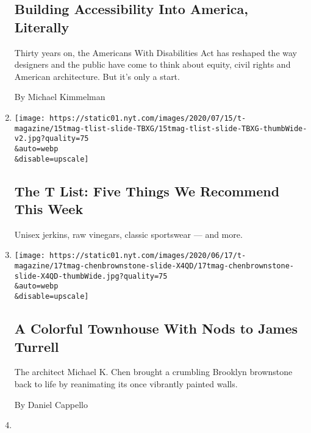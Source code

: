 \begin{enumerate}
  \hypertarget{building-accessibility-into-america-literally}{%
  \subsection{Building Accessibility Into America,
  Literally}\label{building-accessibility-into-america-literally}}

  Thirty years on, the Americans With Disabilities Act has reshaped the
  way designers and the public have come to think about equity, civil
  rights and American architecture. But it's only a start.

  By Michael Kimmelman
\item
  \href{/2020/07/16/t-magazine/margo-price-album-tlist.html}{}

  \texttt{[image: https://static01.nyt.com/images/2020/07/15/t-magazine/15tmag-tlist-slide-TBXG/15tmag-tlist-slide-TBXG-thumbWide-v2.jpg?quality=75\\\&auto=webp\\\&disable=upscale]}

  \hypertarget{the-t-list-five-things-we-recommend-this-week-1}{%
  \subsection{The T List: Five Things We Recommend This
  Week}\label{the-t-list-five-things-we-recommend-this-week-1}}

  Unisex jerkins, raw vinegars, classic sportswear --- and more.
\item
  \href{/2020/07/13/t-magazine/brownstone-brooklyn-design.html}{}

  \texttt{[image: https://static01.nyt.com/images/2020/06/17/t-magazine/17tmag-chenbrownstone-slide-X4QD/17tmag-chenbrownstone-slide-X4QD-thumbWide.jpg?quality=75\\\&auto=webp\\\&disable=upscale]}

  \hypertarget{a-colorful-townhouse-with-nods-to-james-turrell}{%
  \subsection{A Colorful Townhouse With Nods to James
  Turrell}\label{a-colorful-townhouse-with-nods-to-james-turrell}}

  The architect Michael K. Chen brought a crumbling Brooklyn brownstone
  back to life by reanimating its once vibrantly painted walls.

  By Daniel Cappello
\item
  \href{/2020/07/10/t-magazine/jonathan-adler-simon-doonan-home.html}{}


\end{enumerate}
